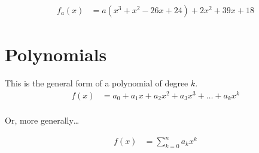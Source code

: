 \documentclass[preview,border=3mm]{article}
\begin{document}
\begin{align}
    f_a(x) &= a(x^3 + x^2 - 26x + 24) + 2x^2 + 39x + 18 \label{eq19}
\end{align}


\section{Polynomials}
\noindent
This is the general form of a polynomial of degree $k$.
\begin{align*}
    f(x) &= a_0 + a_1x + a_2x^2 + a_3x^3 + \ldots + a_kx^k\\
\end{align*}

\noindent
Or, more generally\dots

\begin{align*}
    f(x) &= \sum\limits_{k=0}^n a_kx^k
\end{align*}
\end{document}
